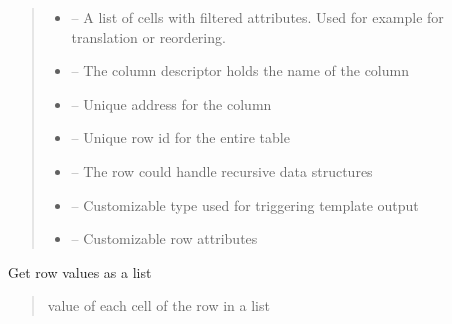 \documentclass[letterpaper,10pt,english]{sphinxmanual}
\begin{document}
\begin{savenotes}
\begin{fulllineitems}
\begin{quote}
\begin{description}
\begin{itemize}
\item {} 
\sphinxAtStartPar
{} – A list of cells with filtered attributes. Used for example for translation or re\sphinxhyphen{}ordering.

\item {} 
\sphinxAtStartPar
{} – The column descriptor holds the name of the column

\item {} 
\sphinxAtStartPar
{} – Unique address for the column

\item {} 
\sphinxAtStartPar
{} – Unique row id for the entire table

\item {} 
\sphinxAtStartPar
{} – The row could handle recursive data structures

\item {} 
\sphinxAtStartPar
{} – Customizable type used for triggering template output

\item {} 
\sphinxAtStartPar
{} – Customizable row attributes

\end{itemize}

\end{description}\end{quote}

\begin{savenotes}\begin{fulllineitems}
\label{\detokenize{eezz:eezz.table.TTableRow.get_values_list}}
\pysigstartsignatures
{}
\pysigstopsignatures
\sphinxAtStartPar
Get row values as a list
\begin{quote}\begin{description}
\sphinxAtStartPar
value of each cell of the row in a list

\end{description}\end{quote}

\end{fulllineitems}\end{savenotes}


\end{fulllineitems}\end{savenotes}
\end{document}
